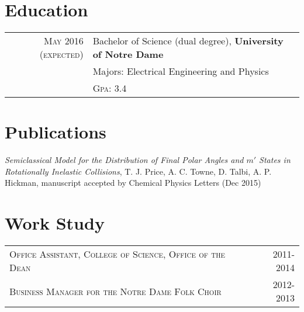 \documentclass[a4paper,10pt]{article} %
\begin{document}

\section{Education}

\begin{tabular}{rl}	
\textsc{May 2016 (expected)}& Bachelor of Science (dual degree), \textbf{University of Notre Dame}\\
& Majors: Electrical Engineering and Physics\\
&\normalsize \textsc{Gpa}: 3.4
\end{tabular}


\section{Publications}

\emph{Semiclassical Model for the Distribution of Final Polar Angles and $m'$
States in Rotationally Inelastic Collisions}, T. J.
Price, A. C. Towne, D. Talbi, A. P. Hickman,
    manuscript accepted by Chemical Physics Letters (Dec 2015)


\section{Work Study}

\begin{tabular}{lr}
    \textsc{Office Assistant, College of Science, Office of the Dean}&{2011-2014}\\
    \textsc{Business Manager for the Notre Dame Folk Choir}&{2012-2013}
\end{tabular}

\end{document}
